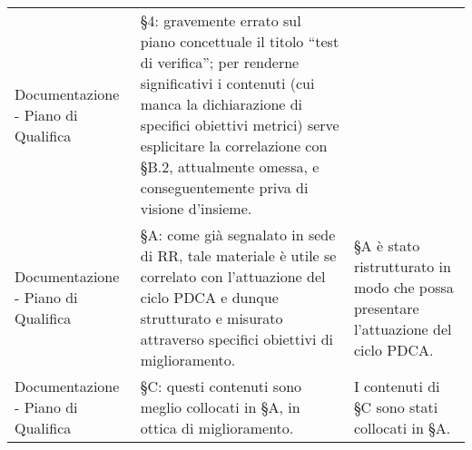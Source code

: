 \begin{longtable}{ 
				>{\centering}p{} 
				>{\centering}p{}
				>{\centering\arraybackslash}p{}}
				Documentazione - Piano di Qualifica
					&
				§4: gravemente errato sul piano concettuale il titolo “test di verifica”; per renderne significativi i contenuti (cui manca la dichiarazione di specifici obiettivi metrici) serve esplicitare la correlazione con §B.2, attualmente omessa, e conseguentemente priva di visione d’insieme. 
					&
				
					\\
				
				Documentazione - Piano di Qualifica
					&
				§A: come già segnalato in sede di RR, tale materiale è utile se correlato con l’attuazione del ciclo PDCA\ped{\textit{G}} e dunque strutturato e misurato attraverso specifici obiettivi di miglioramento. 
					&
				§A è stato ristrutturato in modo che possa presentare l'attuazione del ciclo PDCA\ped{\textit{G}}.
					\\
					
				Documentazione - Piano di Qualifica
					&
				§C: questi contenuti sono meglio collocati in §A, in ottica di miglioramento. 
					&
				I contenuti di §C sono stati collocati in §A.
					\\
			\end{longtable}
			

